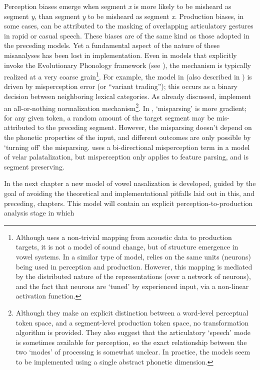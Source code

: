Perception biases emerge when segment \emph{x} is more likely to be
misheard as segment \emph{y}, than segment \emph{y} to be misheard
as segment \emph{x}. Production biases, in some cases, can be attributed
to the masking of overlapping articulatory gestures in rapid or casual
speech. These biases are of the same kind as those adopted in the
preceding models. Yet a fundamental aspect of the nature of these
misanalyses has been lost in implementation. Even in models that explicitly
invoke the Evolutionary Phonology framework (see \citealt{Blevins2004}),
the mechanism is typically realized at a very coarse grain\footnote{Although \citet{Boer2000} uses a non-trivial mapping from acoustic
data to production targets, it is not a model of sound change, but
of structure emergence in vowel systems. In a similar type of model,
\citet{oudeyer2006self} relies on the same units (neurons) being
used in perception and production. However, this mapping is mediated
by the distributed nature of the representations (over a network of
neurons), and the fact that neurons are `tuned' by experienced input,
via a non-linear activation function. }. For example, the model in \citet{wedel2017category} (also described
in \citet{Blevins2009}) is driven by misperception error (or “variant
trading”); this occurs as a binary decision between neighboring
lexical categories. As already discussed, \citet{Garrett2013} implement
an all-or-nothing normalization mechanism\footnote{Although they make an explicit distinction between a word-level perceptual
token space, and a segment-level production token space, no transformation
algorithm is provided. They also suggest that the articulatory `speech'
mode is sometimes available for perception, so the exact relationship
between the two `modes' of processing is somewhat unclear. In practice,
the models seem to be implemented using a single abstract phonetic
dimension.}. In \citet{Kirby2014}, `misparsing' is more gradient; for any given
token, a random amount of the target segment may be mis-attributed
to the preceding segment. However, the misparsing doesn't depend on
the phonetic properties of the input, and different outcomes are only
possible by `turning off' the misparsing. \citet{morley2014implications}
uses a bi-directional misperception term in a model of velar palatalization,
but misperception only applies to feature parsing, and is segment
preserving. 

In the next chapter a new model of vowel nasalization is developed,
guided by the goal of avoiding the theoretical and implementational
pitfalls laid out in this, and preceding, chapters. This model will
contain an explicit perception-to-production analysis stage in which 
